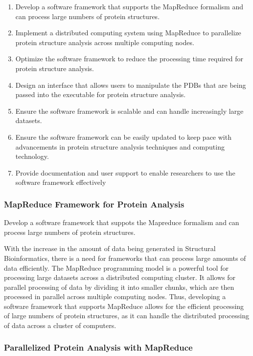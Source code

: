 \documentclass[]{final_report}
\begin{document}
\begin{enumerate}
    \item Develop a software framework that supports the MapReduce formalism and can process large numbers of protein structures.
    \item Implement a distributed computing system using MapReduce to parallelize protein structure analysis across multiple computing nodes.
    \item Optimize the software framework to reduce the processing time required for protein structure analysis.
    \item Design an interface that allows users to manipulate the PDBs that are being passed into the executable for protein structure analysis.
    \item Ensure the software framework is scalable and can handle increasingly large datasets.
    \item Ensure the software framework can be easily updated to keep pace with advancements in protein structure analysis techniques and computing technology.
    \item Provide documentation and user support to enable researchers to use the software framework effectively
\end{enumerate}
\clearpage

\subsubsection{MapReduce Framework for Protein Analysis}

\begin{displayquote}
    Develop a software framework that suppots the Mapreduce formalism and can process large numbers of protein structures.
\end{displayquote}

With the increase in the amount of data being generated in Structural Bioinformatics, there is a need for frameworks that can process large amounts of data efficiently. The MapReduce programming model is a powerful tool for processing large datasets across a distributed computing cluster. It allows for parallel processing of data by dividing it into smaller chunks, which are then processed in parallel across multiple computing nodes. Thus, developing a software framework that supports MapReduce allows for the efficient processing of large numbers of protein structures, as it can handle the distributed processing of data across a cluster of computers.

\subsubsection{Parallelized Protein Analysis with MapReduce}
\end{document}
